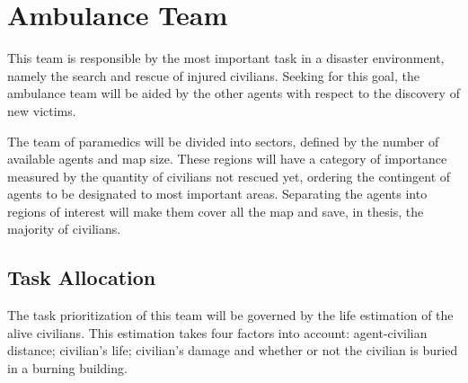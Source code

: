 \section{Ambulance Team}
\label{sec:ambulance}

This team is responsible by the most important task in a disaster environment, namely the search and rescue of injured civilians. Seeking for this goal, the ambulance team will be aided by the other agents with respect to the discovery of new victims.

The team of paramedics will be divided into sectors, defined by the number of available agents and map size. These regions will have a category of importance measured by the quantity of civilians not rescued yet, ordering the contingent of agents to be designated to most important areas. Separating the agents into regions of interest will make them cover all the map and save, in thesis, the majority of civilians.

\subsection{Task Allocation}

The task prioritization of this team will be governed by the life estimation of the alive civilians. This estimation takes four factors into account: agent-civilian distance; civilian's life; civilian's damage and whether or not the civilian is buried in a burning building.


